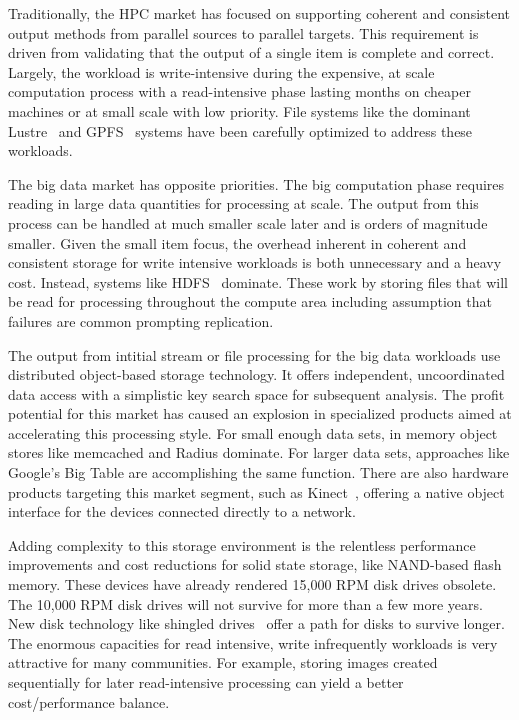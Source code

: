 Traditionally, the HPC market has focused on supporting coherent and consistent
output methods from parallel sources to parallel targets. This requirement is
driven from validating that the output of a single item is complete and
correct. Largely, the workload is write-intensive during the expensive, at
scale computation process with a read-intensive phase lasting months on cheaper
machines or at small scale with low priority. File systems like the dominant
Lustre~\cite{lustre} and GPFS~\cite{gpfs} systems have been carefully optimized
to address these workloads.

The big data market has opposite priorities. The big computation phase requires
reading in large data quantities for processing at scale. The output from this
process can be handled at much smaller scale later and is orders of magnitude
smaller. Given the small item focus, the overhead inherent in coherent and
consistent storage for write intensive workloads is both unnecessary and a
heavy cost. Instead, systems like HDFS~\cite{hdfs} dominate. These work by
storing files that will be read for processing throughout the compute area
including assumption that failures are common prompting replication.

The output from intitial stream or file processing for the big data workloads
use distributed object-based storage technology. It offers independent,
uncoordinated data access with a simplistic key search space for subsequent
analysis. The profit potential for this market has caused an explosion in
specialized products aimed at accelerating this processing style.  For small
enough data sets, in memory object stores like memcached and Radius dominate.
For larger data sets, approaches like Google's Big Table are accomplishing the
same function. There are also hardware products targeting this market segment,
such as Kinect~\cite{segate:kinect}, offering a native object interface for the
devices connected directly to a network.

Adding complexity to this storage environment is the relentless performance
improvements and cost reductions for solid state storage, like NAND-based flash
memory. These devices have already rendered 15,000 RPM disk drives obsolete.
The 10,000 RPM disk drives will not survive for more than a few more years.
New disk technology like shingled drives~\cite{shingled-media} offer a path for
disks to survive longer. The enormous capacities for read intensive, write
infrequently workloads is very attractive for many communities. For example,
storing images created sequentially for later read-intensive processing can
yield a better cost/performance balance.

